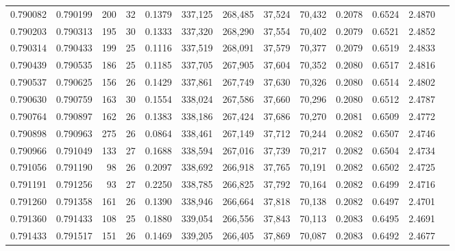 \begin{tabular}{rrrrrrrrrrrrr}
0.790082 & 0.790199 &   200 &  32 &                                     0.1379 & 337,125 & 268,485 &  37,524 &  70,432 & 0.2078 & 0.6524 & 2.4870 \\
0.790203 & 0.790313 &   195 &  30 &                                     0.1333 & 337,320 & 268,290 &  37,554 &  70,402 & 0.2079 & 0.6521 & 2.4852 \\
0.790314 & 0.790433 &   199 &  25 &                                     0.1116 & 337,519 & 268,091 &  37,579 &  70,377 & 0.2079 & 0.6519 & 2.4833 \\
0.790439 & 0.790535 &   186 &  25 &                                     0.1185 & 337,705 & 267,905 &  37,604 &  70,352 & 0.2080 & 0.6517 & 2.4816 \\
0.790537 & 0.790625 &   156 &  26 &                                     0.1429 & 337,861 & 267,749 &  37,630 &  70,326 & 0.2080 & 0.6514 & 2.4802 \\
0.790630 & 0.790759 &   163 &  30 &                                     0.1554 & 338,024 & 267,586 &  37,660 &  70,296 & 0.2080 & 0.6512 & 2.4787 \\
0.790764 & 0.790897 &   162 &  26 &                                     0.1383 & 338,186 & 267,424 &  37,686 &  70,270 & 0.2081 & 0.6509 & 2.4772 \\
0.790898 & 0.790963 &   275 &  26 &                                     0.0864 & 338,461 & 267,149 &  37,712 &  70,244 & 0.2082 & 0.6507 & 2.4746 \\
0.790966 & 0.791049 &   133 &  27 &                                     0.1688 & 338,594 & 267,016 &  37,739 &  70,217 & 0.2082 & 0.6504 & 2.4734 \\
0.791056 & 0.791190 &    98 &  26 &                                     0.2097 & 338,692 & 266,918 &  37,765 &  70,191 & 0.2082 & 0.6502 & 2.4725 \\
0.791191 & 0.791256 &    93 &  27 &                                     0.2250 & 338,785 & 266,825 &  37,792 &  70,164 & 0.2082 & 0.6499 & 2.4716 \\
0.791260 & 0.791358 &   161 &  26 &                                     0.1390 & 338,946 & 266,664 &  37,818 &  70,138 & 0.2082 & 0.6497 & 2.4701 \\
0.791360 & 0.791433 &   108 &  25 &                                     0.1880 & 339,054 & 266,556 &  37,843 &  70,113 & 0.2083 & 0.6495 & 2.4691 \\
0.791433 & 0.791517 &   151 &  26 &                                     0.1469 & 339,205 & 266,405 &  37,869 &  70,087 & 0.2083 & 0.6492 & 2.4677 \\

\end{tabular}

